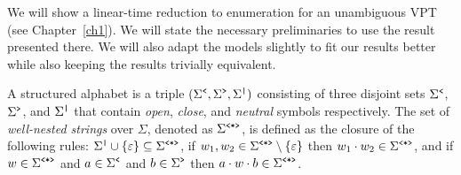 We will show a linear-time reduction to enumeration for an unambiguous VPT (see Chapter~\ref{ch1}).
We will state the necessary preliminaries to use the result presented there. We will also adapt the models slightly to fit our results better while also keeping the results trivially equivalent.

%
%

A structured alphabet is a triple $(\Sigma^{\texttt{<}}, \Sigma^{\texttt{>}}, \Sigma^{\texttt{|}})$ consisting of three disjoint sets $\Sigma^{\texttt{<}}$, $\Sigma^{\texttt{>}}$, and $\Sigma^{\texttt{|}}$ that contain {\it open}, {\it close}, and {\it neutral} symbols respectively.
%
%
The set of {\em well-nested strings}
over $\Sigma$, denoted as $\Sigma^{\texttt{<*>}}$, is defined as the closure of the following rules: 
$\Sigma^{\texttt{|}} \cup \{\varepsilon\} \subseteq \Sigma^{\texttt{<*>}}$,
if $w_1, w_2 \in \Sigma^{\texttt{<*>}}\setminus\{\varepsilon\}$ then $w_1 \cdot w_2 \in \Sigma^{\texttt{<*>}}$, and if $w \in \Sigma^{\texttt{<*>}}$ and $a \in \Sigma^{\texttt{<}}$ and $b \in \Sigma^{\texttt{>}}$ then $a\cdot w\cdot b \in \Sigma^{\texttt{<*>}}$. 
%
%

